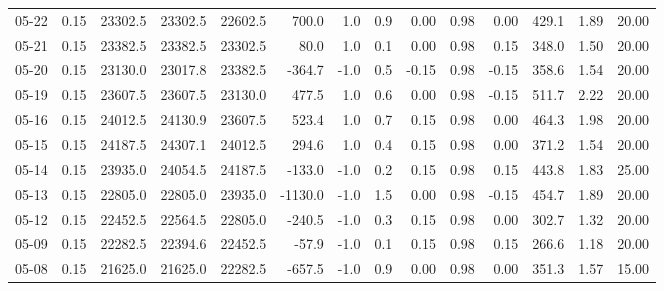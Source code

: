 \begin{threeparttable}
{\begin{tabular}{lrrrrrrrrrrrrr}
  05-22 &     0.15 & 23302.5 & 23302.5 & 22602.5 &      700.0 &                      1.0 &                 0.9 &       0.00 &      0.98 &           0.00 &            429.1 &            1.89 &                  20.00 \\
  05-21 &     0.15 & 23382.5 & 23382.5 & 23302.5 &       80.0 &                      1.0 &                 0.1 &       0.00 &      0.98 &           0.15 &            348.0 &            1.50 &                  20.00 \\
  05-20 &     0.15 & 23130.0 & 23017.8 & 23382.5 &     -364.7 &                     -1.0 &                 0.5 &      -0.15 &      0.98 &          -0.15 &            358.6 &            1.54 &                  20.00 \\
  05-19 &     0.15 & 23607.5 & 23607.5 & 23130.0 &      477.5 &                      1.0 &                 0.6 &       0.00 &      0.98 &          -0.15 &            511.7 &            2.22 &                  20.00 \\
  05-16 &     0.15 & 24012.5 & 24130.9 & 23607.5 &      523.4 &                      1.0 &                 0.7 &       0.15 &      0.98 &           0.00 &            464.3 &            1.98 &                  20.00 \\
  05-15 &     0.15 & 24187.5 & 24307.1 & 24012.5 &      294.6 &                      1.0 &                 0.4 &       0.15 &      0.98 &           0.00 &            371.2 &            1.54 &                  20.00 \\
  05-14 &     0.15 & 23935.0 & 24054.5 & 24187.5 &     -133.0 &                     -1.0 &                 0.2 &       0.15 &      0.98 &           0.15 &            443.8 &            1.83 &                  25.00 \\
  05-13 &     0.15 & 22805.0 & 22805.0 & 23935.0 &    -1130.0 &                     -1.0 &                 1.5 &       0.00 &      0.98 &          -0.15 &            454.7 &            1.89 &                  20.00 \\
  05-12 &     0.15 & 22452.5 & 22564.5 & 22805.0 &     -240.5 &                     -1.0 &                 0.3 &       0.15 &      0.98 &           0.00 &            302.7 &            1.32 &                  20.00 \\
  05-09 &     0.15 & 22282.5 & 22394.6 & 22452.5 &      -57.9 &                     -1.0 &                 0.1 &       0.15 &      0.98 &           0.15 &            266.6 &            1.18 &                  20.00 \\
  05-08 &     0.15 & 21625.0 & 21625.0 & 22282.5 &     -657.5 &                     -1.0 &                 0.9 &       0.00 &      0.98 &           0.00 &            351.3 &            1.57 &                  15.00 \\

\end{tabular}}
\end{threeparttable}
